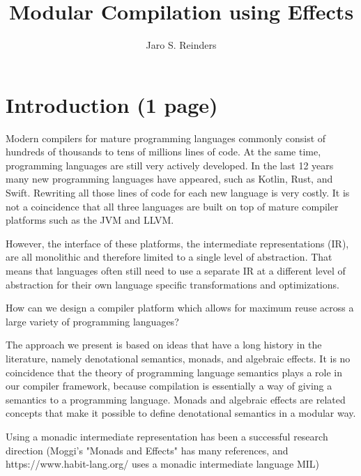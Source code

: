 \documentclass[sigplan,anonymous,review]{acmart}
\title{Modular Compilation using Effects}
\author{Jaro S. Reinders} %
\begin{document}
\begin{abstract}

\end{abstract}

\maketitle

\section{Introduction (1 page)} \label{sec:intro}

Modern compilers for mature programming languages commonly consist of hundreds of thousands to tens of millions lines of code.
At the same time, programming languages are still very actively developed.
In the last 12 years many new programming languages have appeared, such as Kotlin, Rust, and Swift.
Rewriting all those lines of code for each new language is very costly.
It is not a coincidence that all three languages are built on top of mature compiler platforms such as the JVM and LLVM.

However, the interface of these platforms, the intermediate representations (IR), are all monolithic and therefore limited to a single level of abstraction.
That means that languages often still need to use a separate IR at a different level of abstraction for their own language specific transformations and optimizations.

How can we design a compiler platform which allows for maximum reuse across a large variety of programming languages?

The approach we present is based on ideas that have a long history in the literature, namely denotational semantics, monads, and algebraic effects.
It is no coincidence that the theory of programming language semantics plays a role in our compiler framework, because compilation is essentially a way of giving a semantics to a programming language.
Monads and algebraic effects are related concepts that make it possible to define denotational semantics in a modular way.

Using a monadic intermediate representation has been a successful research direction (Moggi's "Monads and Effects" has many references, and https://www.habit-lang.org/ uses a monadic intermediate language MIL)
\end{document}
